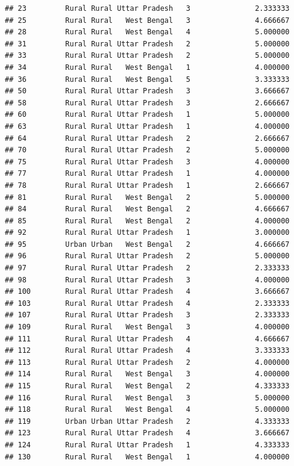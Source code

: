 \documentclass[
]{article}
\begin{document}
\begin{verbatim}
## 23         Rural Rural Uttar Pradesh   3               2.333333
## 25         Rural Rural   West Bengal   3               4.666667
## 28         Rural Rural   West Bengal   4               5.000000
## 31         Rural Rural Uttar Pradesh   2               5.000000
## 33         Rural Rural Uttar Pradesh   2               5.000000
## 34         Rural Rural   West Bengal   1               4.000000
## 36         Rural Rural   West Bengal   5               3.333333
## 50         Rural Rural Uttar Pradesh   3               3.666667
## 58         Rural Rural Uttar Pradesh   3               2.666667
## 60         Rural Rural Uttar Pradesh   1               5.000000
## 63         Rural Rural Uttar Pradesh   1               4.000000
## 64         Rural Rural Uttar Pradesh   2               2.666667
## 70         Rural Rural Uttar Pradesh   2               5.000000
## 75         Rural Rural Uttar Pradesh   3               4.000000
## 77         Rural Rural Uttar Pradesh   1               4.000000
## 78         Rural Rural Uttar Pradesh   1               2.666667
## 81         Rural Rural   West Bengal   2               5.000000
## 84         Rural Rural   West Bengal   2               4.666667
## 85         Rural Rural   West Bengal   2               4.000000
## 92         Rural Rural Uttar Pradesh   1               3.000000
## 95         Urban Urban   West Bengal   2               4.666667
## 96         Rural Rural Uttar Pradesh   2               5.000000
## 97         Rural Rural Uttar Pradesh   2               2.333333
## 98         Rural Rural Uttar Pradesh   3               4.000000
## 100        Rural Rural Uttar Pradesh   4               3.666667
## 103        Rural Rural Uttar Pradesh   4               2.333333
## 107        Rural Rural Uttar Pradesh   3               2.333333
## 109        Rural Rural   West Bengal   3               4.000000
## 111        Rural Rural Uttar Pradesh   4               4.666667
## 112        Rural Rural Uttar Pradesh   4               3.333333
## 113        Rural Rural Uttar Pradesh   2               4.000000
## 114        Rural Rural   West Bengal   3               4.000000
## 115        Rural Rural   West Bengal   2               4.333333
## 116        Rural Rural   West Bengal   3               5.000000
## 118        Rural Rural   West Bengal   4               5.000000
## 119        Urban Urban Uttar Pradesh   2               4.333333
## 123        Rural Rural Uttar Pradesh   4               3.666667
## 124        Rural Rural Uttar Pradesh   1               4.333333
## 130        Rural Rural   West Bengal   1               4.000000

\end{verbatim}
\end{document}
